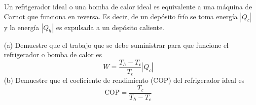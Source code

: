 \item Un refrigerador ideal o una bomba de calor ideal es equivalente a una máquina de Carnot que funciona en reversa. Es decir, de un depósito frío se toma energía $|Q_c|$ y la energía $|Q_h|$ es expulsada a un depósito caliente. 
    
(a) Demuestre que el trabajo que se debe suministrar para que funcione el refrigerador o bomba de calor es
$$ W = \frac{T_h - T_c}{T_c} |Q_c| $$
(b) Demuestre que el coeficiente de rendimiento (COP) del refrigerador ideal es
$$ \text{COP} = \frac{T_c}{T_h - T_c} $$
